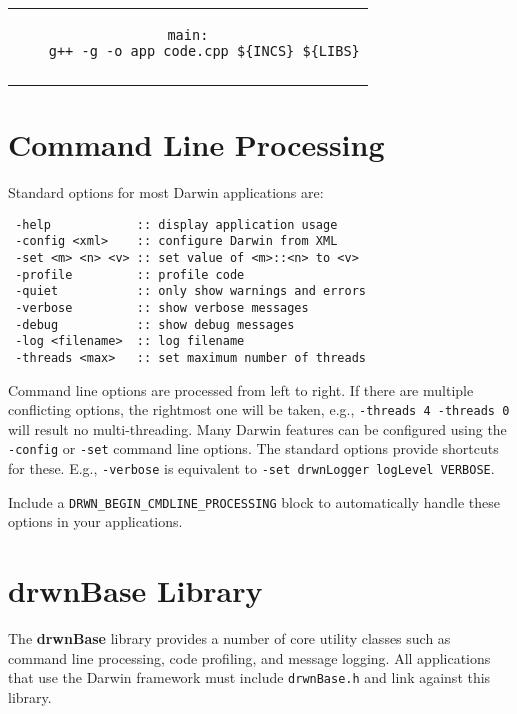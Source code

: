 \documentclass[landscape,8pt]{article}
\newcommand{\thickhline}{\noalign{\hrule height 0.8pt}}
\begin{document}
\begin{multicols}{3}
\begin{tabular}{c}
\begin{minipage}[h]{0.95\columnwidth}
\begin{verbatim}
main:
    g++ -g -o app code.cpp ${INCS} ${LIBS}
\end{verbatim}
\smallskip
\end{minipage}\\
\thickhline
\end{tabular}
\smallskip


\section*{Command Line Processing}

Standard options for most {\sc Darwin} applications are:
\begin{verbatim}
 -help            :: display application usage
 -config <xml>    :: configure Darwin from XML
 -set <m> <n> <v> :: set value of <m>::<n> to <v>
 -profile         :: profile code
 -quiet           :: only show warnings and errors
 -verbose         :: show verbose messages
 -debug           :: show debug messages
 -log <filename>  :: log filename
 -threads <max>   :: set maximum number of threads
\end{verbatim}

Command line options are processed from left to right. If there are
multiple conflicting options, the rightmost one will be taken, e.g.,
\texttt{-threads 4 -threads 0} will result no multi-threading.
Many {\sc Darwin} features can be configured using the
\texttt{-config} or \texttt{-set} command line options. The standard
options provide shortcuts for these. E.g., \texttt{-verbose} is
equivalent to \texttt{-set drwnLogger logLevel VERBOSE}.

Include a \texttt{DRWN\_BEGIN\_CMDLINE\_PROCESSING} block to
automatically handle these options in your applications.


\section*{drwnBase Library}

The {\bf drwnBase} library provides a number of core utility classes
such as command line processing, code profiling, and message
logging. All applications that use the {\sc Darwin} framework must
include \texttt{drwnBase.h} and link against this library.


\end{multicols}
\end{document}
